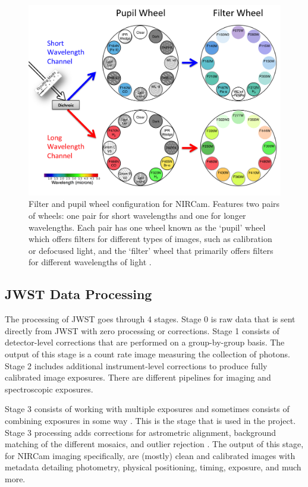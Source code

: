 \documentclass[10pt,twocolumn,letterpaper]{article}
\begin{document}
\begin{figure}[t]
  \centering
  \includegraphics[scale=0.081]{wheels}
  \caption{Filter and pupil wheel configuration for NIRCam. Features two pairs of wheels: one pair for short wavelengths and one for longer wavelengths. Each pair has one wheel known as the `pupil' wheel which offers filters for different types of images, such as calibration or defocused light, and the `filter' wheel that primarily offers filters for different wavelengths of light \cite{webbwheels}.}
  \label{fig:wheels}
\end{figure}

\subsection{JWST Data Processing}
The processing of JWST goes through 4 stages. Stage 0 is raw data that is sent directly from JWST with zero processing or corrections. Stage 1 consists of detector-level corrections that are performed on a group-by-group basis. The output of this stage is a count rate image measuring the collection of photons.
Stage 2 includes additional instrument-level corrections to produce fully calibrated image exposures. There are different pipelines for imaging and spectroscopic exposures.

Stage 3 consists of working with multiple exposures and sometimes consists of combining exposures in some way \cite{webbstages}. 
This is the stage that is used in the project. Stage 3 processing adds corrections for astrometric alignment, background matching of the different mosaics, and outlier rejection \cite{webbstage3}. 
The output of this stage, for NIRCam imaging specifically, are (mostly) clean and calibrated images with metadata detailing photometry, physical positioning, timing, exposure, and much more.
\end{document}

